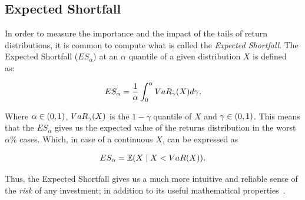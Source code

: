 \subsection*{Expected Shortfall}

In order to measure the importance and the impact of the tails of return distributions, it is common to compute what is called the \textit{Expected Shortfall}. The Expected Shortfall ($ES_{\alpha}$) at an $\alpha$ quantile of a given distribution $X$ is defined~\cite{a:mcneil-es} as:

\begin{align} \label{expected-shortfall}
ES_{\alpha} = \frac{1}{\alpha}\int_{0}^{\alpha}VaR_{\gamma}\qty(X)d\gamma \textit{,}
\end{align}

Where $\alpha \in \qty(0,1)$, $VaR_{\gamma}\qty(X)$ is the $1-\gamma$ quantile of $X$ and $\gamma \in \qty(0,1)$. This means that the $ES_{\alpha}$ gives us the expected value of the returns distribution in the worst $\alpha \%$ cases. Which, in case of a continuous $X$, can be expressed as

\begin{align}
	ES_{\alpha} = \EX\giventhat{X}{X < VaR(X)}\emph{.}
\end{align}

Thus, the Expected Shortfall gives us a much more intuitive and reliable sense of the \textit{risk} of any investment; in addition to its useful mathematical properties~\cite{a:bertsimas-shortfall}.

